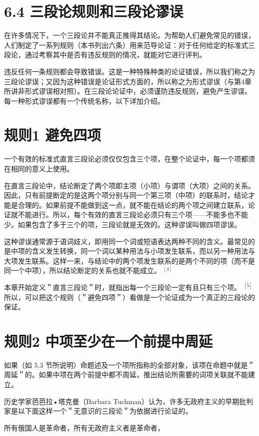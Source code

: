 \section*{6.4 三段论规则和三段论谬误}
在许多情况下，一个三段论并不能真正推得其结论。为帮助人们避免常见的错误，人们制定了一系列规则（本书列出六条）用来范导论证：对于任何给定的标准式三段论，通过考察其中是否有违反规则的情况，就能对它进行评判。

违反任何一条规则都会导致错误。这是一种特殊种类的论证错误，所以我们称之为三段论谬误；又因为这种错误是论证形式方面的，所以称之为形式谬误（与第4章所讲非形式谬误相对照）。在三段论论证中，必须谨防违反规则，避免产生谬误。每一种形式谬误都有一个传统名称，以下详加介绍。

\section*{规则1 避免四项}
一个有效的标准式直言三段论必须仅仅包含三个项，在整个论证中，每一个项都须在相同的意义上使用。

在直言三段论中，结论断定了两个项即主项（小项）与谓项（大项）之间的关系。因此，只有前提断定的是这两个项分别与同一个第三项（中项）的联系时，结论才能是合理的。如果前提不能做到这一点，就不能在结论的两个项之间建立联系，论证就不能进行。所以，每个有效的直言三段论必须只有三个项——不能多也不能少。如果包含了多于三个的项，三段论就是无效的。这种谬误叫做四项谬误。

这种谬误通常源于语词歧义，即用同一个词或短语表达两种不同的含义。最常见的是中项的含义发生转换，同一个词以某种用法与小项发生联系，而以另一种用法与大项发生联系。这样一来，与结论中的两个项发生联系的是两个不同的项（而不是同一个中项），所以结论断定的关系也就不能成立。 ${ }^{[4]}$

本章开始定义＂直言三段论＂时，就指出每一个三段论一定有且只有三个项。 ${ }^{[5]}$ 所以，可以把这个规则（＂避免四项＂）看做是一个论证成为一个真正的三段论的保证。

\section*{规则2 中项至少在一个前提中周延}
如果（如 5.3 节所说明）命题述及一个项所指称的全部对象，该项在命题中就是＂周延＂的。如果中项在两个前提中都不周延，推出结论所需要的词项关联就不能建立。

历史学家芭芭拉•塔克曼（Barbara Tuchman）认为，许多无政府主义的早期批判家是以下面这样一个＂无意识的三段论＂为依据进行论证的。

\begin{displayquote}
所有俄国人是革命者，所有无政府主义者是革命者，
\end{displayquote}

